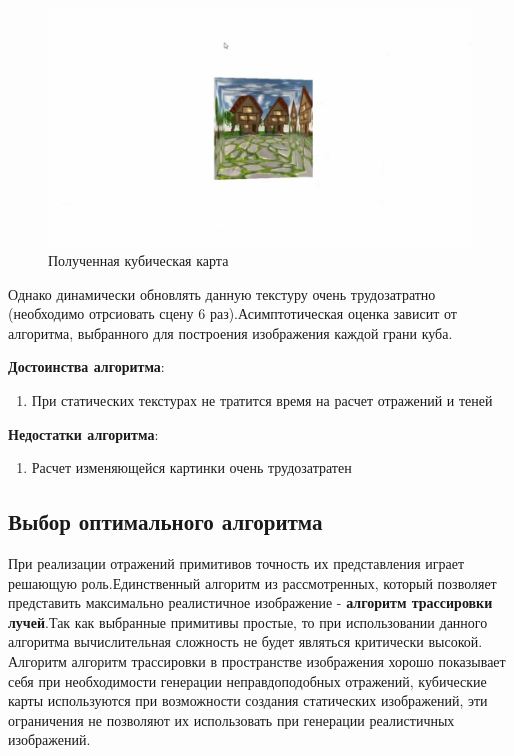 \documentclass[a4paper,14pt,unknownkeysallowed]{extreport}
\begin{document}
\begin{figure}[H]
	\centering
	\includegraphics[scale=0.4]{cube_maps_real_example}
	\caption{Полученная кубическая карта}
	\label{fig:cube_maps_real_example}
\end{figure}


Однако динамически обновлять данную текстуру очень трудозатратно (необходимо отрсиовать сцену 6 раз).Асимптотическая оценка зависит от алгоритма, выбранного для построения изображения каждой грани куба.


\textbf{Достоинства алгоритма}:
\begin{enumerate}
	\item При статических текстурах не тратится время на расчет отражений и теней \cite{reflexion_types}
\end{enumerate}

\textbf{Недостатки алгоритма}:
\begin{enumerate}
	\item Расчет изменяющейся картинки очень трудозатратен \cite{reflexion_types}
\end{enumerate}

\subsection{Выбор оптимального алгоритма}
При реализации отражений примитивов точность их представления играет решающую роль.Единственный алгоритм из рассмотренных, который позволяет представить максимально
реалистичное изображение - \textbf{алгоритм трассировки лучей}.Так как выбранные примитивы простые, то при использовании данного алгоритма вычислительная
сложность не будет являться критически высокой. Алгоритм алгоритм трассировки в пространстве изображения хорошо показывает себя при необходимости генерации неправдоподобных отражений, кубические карты
используются при возможности создания статических изображений, эти ограничения не позволяют их использовать при генерации реалистичных изображений.
\end{document}
